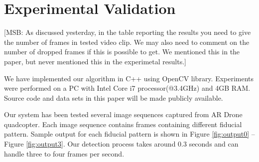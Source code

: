 \documentclass[runningheads]{llncs}
\begin{document}
\section{Experimental Validation}

[MSB: As discussed yesterday, in the table reporting the results you need to give the 
number of frames in tested video clip.  We may also need to comment on the
number of dropped frames if this is possible to get. We mentioned this in the
paper, but never mentioned this in the experimetal results.]

We have implemented our algorithm in C++ using OpenCV library.
Experiments were performed on a PC with Intel Core i7 processor(@3.4GHz) and 4GB RAM.
Source code and data sets in this paper will be made publicly available.

Our system has been tested several image sequences captured from AR Drone
quadcopter. Each image sequence contains frames containing different fiducial
pattern. Sample output for each fiducial pattern is shown in Figure
\ref{fig:output0} -- Figure \ref{fig:output3}. Our detection process takes
around 0.3 seconds and can handle three to four frames per second.
\end{document}
